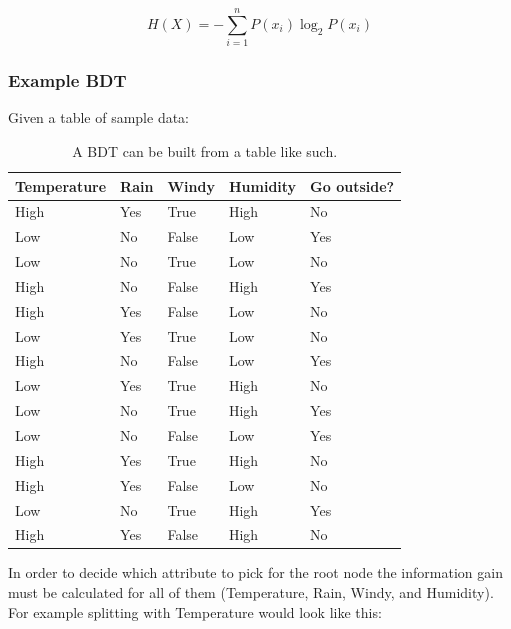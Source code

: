 \documentclass[
12pt,
headsepline,
bibliography=totoc,
twoside=semi,
fleqn
]{scrartcl}
\begin{document}
\begin{centering}
   \begin{equation}\label{fig:fig3}
      H(X)= - \sum_{i=1}^{n}P(x_i)\log_2{P(x_i)}
   \end{equation}  
\end{centering}

 \subsubsection{Example BDT\label{sec:sec2-1-3}}
 Given a table of sample data: \\
 
 
 \small\begin{table}[]
   \begin{tabular}{|l|l|l|l||l|}
      \hline
      Temperature & Rain & Windy & Humidity & Go outside? \\
    \hline
    \hline
    High & Yes & True & High & No \\
    \hline
    Low& No & False & Low & Yes \\
    \hline
    Low& No & True & Low & No \\
    \hline
    High& No & False &  High& Yes \\
    \hline
    High&  Yes& False & Low & No \\
    \hline
    Low& Yes & True & Low & No \\
    \hline
    High& No &  False&  Low& Yes \\
    \hline
    Low&  Yes& True & High & No \\
    \hline
    Low&  No& True & High &  Yes\\
    \hline
    Low&  No&  False& Low & Yes \\
    \hline
    High&  Yes& True & High &  No\\
    \hline
    High&  Yes&  False& Low & No \\
    Low&  No& True& High & Yes\\
    \hline
    High& Yes & False & High & No\\
    \hline
   \end{tabular}
   \label{fig:fig5}
   \caption{A BDT can be built from a table like such.}
   \end{table}

 
 In order to decide which attribute to pick for the root node the information gain must be calculated for all of them (Temperature, Rain, Windy, and Humidity). For example splitting with Temperature would look like this: \\
\end{document}
